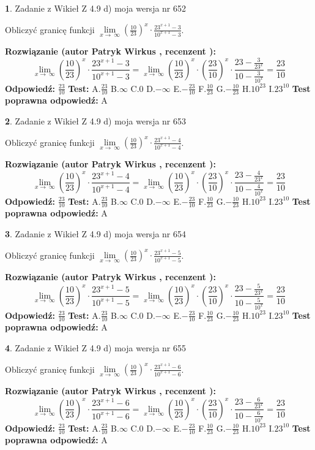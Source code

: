 \documentclass[12pt, a4paper]{article}
\theoremstyle{definition} %
\newtheorem{zad}{}
\newcommand{\zadStart}[1]{\begin{zad}#1\newline}
\newcommand{\zadStop}{\end{zad}}
\newcommand{\rozwStart}[2]{\noindent \textbf{Rozwiązanie (autor #1 , recenzent #2): }\newline}
\newcommand{\rozwStop}{\newline}
\newcommand{\odpStart}{\noindent \textbf{Odpowiedź:}\newline}
\newcommand{\odpStop}{\newline}
\newcommand{\testStart}{\noindent \textbf{Test:}\newline}
\newcommand{\testStop}{\newline}
\newcommand{\kluczStart}{\noindent \textbf{Test poprawna odpowiedź:}\newline}
\newcommand{\kluczStop}{\newline}
\begin{document}
\zadStart{Zadanie z Wikieł Z 4.9 d) moja wersja nr 652}


Obliczyć granicę funkcji  $\lim\limits_{x\to\ \infty}(\frac{10}{23})^{x}\cdot\frac{23^{x+1}-3}{10^{x+1}-3}$.
\zadStop
\rozwStart{Patryk Wirkus}{}
$$\lim\limits_{x\to\ \infty}(\frac{10}{23})^{x}\cdot\frac{23^{x+1}-3}{10^{x+1}-3}=\lim\limits_{x\to\ \infty}(\frac{10}{23})^{x}\cdot(\frac{23}{10})^{x} \cdot \frac{23-\frac{3}{23^{x}}}{10-\frac{3}{10^{x}}} = \frac{23}{10}$$
\rozwStop
\odpStart
$\frac{23}{10}$
\odpStop
\testStart
A.$\frac{23}{10}$ B.$\infty$ C.$0$ D.$-\infty$ E.$-\frac{23}{10}$
F.$\frac{10}{23}$ G.$-\frac{10}{23}$
H.$10^{23}$
I.$23^{10}$
\testStop
\kluczStart
A
\kluczStop



\zadStart{Zadanie z Wikieł Z 4.9 d) moja wersja nr 653}


Obliczyć granicę funkcji  $\lim\limits_{x\to\ \infty}(\frac{10}{23})^{x}\cdot\frac{23^{x+1}-4}{10^{x+1}-4}$.
\zadStop
\rozwStart{Patryk Wirkus}{}
$$\lim\limits_{x\to\ \infty}(\frac{10}{23})^{x}\cdot\frac{23^{x+1}-4}{10^{x+1}-4}=\lim\limits_{x\to\ \infty}(\frac{10}{23})^{x}\cdot(\frac{23}{10})^{x} \cdot \frac{23-\frac{4}{23^{x}}}{10-\frac{4}{10^{x}}} = \frac{23}{10}$$
\rozwStop
\odpStart
$\frac{23}{10}$
\odpStop
\testStart
A.$\frac{23}{10}$ B.$\infty$ C.$0$ D.$-\infty$ E.$-\frac{23}{10}$
F.$\frac{10}{23}$ G.$-\frac{10}{23}$
H.$10^{23}$
I.$23^{10}$
\testStop
\kluczStart
A
\kluczStop



\zadStart{Zadanie z Wikieł Z 4.9 d) moja wersja nr 654}


Obliczyć granicę funkcji  $\lim\limits_{x\to\ \infty}(\frac{10}{23})^{x}\cdot\frac{23^{x+1}-5}{10^{x+1}-5}$.
\zadStop
\rozwStart{Patryk Wirkus}{}
$$\lim\limits_{x\to\ \infty}(\frac{10}{23})^{x}\cdot\frac{23^{x+1}-5}{10^{x+1}-5}=\lim\limits_{x\to\ \infty}(\frac{10}{23})^{x}\cdot(\frac{23}{10})^{x} \cdot \frac{23-\frac{5}{23^{x}}}{10-\frac{5}{10^{x}}} = \frac{23}{10}$$
\rozwStop
\odpStart
$\frac{23}{10}$
\odpStop
\testStart
A.$\frac{23}{10}$ B.$\infty$ C.$0$ D.$-\infty$ E.$-\frac{23}{10}$
F.$\frac{10}{23}$ G.$-\frac{10}{23}$
H.$10^{23}$
I.$23^{10}$
\testStop
\kluczStart
A
\kluczStop



\zadStart{Zadanie z Wikieł Z 4.9 d) moja wersja nr 655}


Obliczyć granicę funkcji  $\lim\limits_{x\to\ \infty}(\frac{10}{23})^{x}\cdot\frac{23^{x+1}-6}{10^{x+1}-6}$.
\zadStop
\rozwStart{Patryk Wirkus}{}
$$\lim\limits_{x\to\ \infty}(\frac{10}{23})^{x}\cdot\frac{23^{x+1}-6}{10^{x+1}-6}=\lim\limits_{x\to\ \infty}(\frac{10}{23})^{x}\cdot(\frac{23}{10})^{x} \cdot \frac{23-\frac{6}{23^{x}}}{10-\frac{6}{10^{x}}} = \frac{23}{10}$$
\rozwStop
\odpStart
$\frac{23}{10}$
\odpStop
\testStart
A.$\frac{23}{10}$ B.$\infty$ C.$0$ D.$-\infty$ E.$-\frac{23}{10}$
F.$\frac{10}{23}$ G.$-\frac{10}{23}$
H.$10^{23}$
I.$23^{10}$
\testStop
\kluczStart
A
\kluczStop
\end{document}
